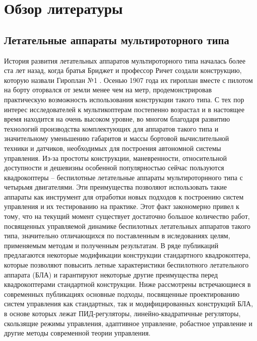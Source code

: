 

\chapter{Обзор литературы} \label{review}
\section{Летательные аппараты мультироторного типа} \label{review_s1}

История развития летательных аппаратов мультироторного типа началась более ста лет назад, когда братья Бриджет и профессор Ричет создали конструкцию, которую назвали Гироплан №1 \cite{Leishman02, Leishman01}. Осенью 1907 года их гироплан вместе с пилотом на борту оторвался от земли менее чем на метр, продемонстрировав практическую возможность использования конструкции такого типа. С тех пор интерес исследователей к мультикоптерам постепенно возрастал и в настоящее время находится на очень высоком уровне, во многом благодаря развитию технологий производства комплектующих для аппаратов такого типа и значительному уменьшению габаритов и массы бортовой вычислительной техники и датчиков, необходимых для построения автономной системы управления. Из-за простоты конструкции, маневренности, относительной доступности и дешевизны особенной популярностью сейчас пользуются квадрокоптеры -- беспилотные летательные аппараты мультироторнного типа с четырьмя двигателями. Эти преимущества позволяют использовать такие аппараты как инструмент для отработки новых подходов к построению систем управления и их тестированию на практике. Этот факт закономерно привел к тому, что на текущий момент существует достаточно большое количество работ, посвященных управляемой динамике беспилотных летательных аппаратов такого типа, значительно отличающихся по поставленным в иследованиях целям, применяемым методам и полученным результатам. В ряде публикаций предлагаются некоторые модификации конструкции стандартного квадрокоптера, которые позволяют повысить летные характеристики беспилотного летательного аппарата (БЛА) и гарантируют некоторые другие преимущества перед квадрокоптерами стандартной конструкции. Ниже рассмотрены встречающиеся в современных публикациях основные подходы, посвященные проектированию систем управления как стандартных, так и модифицированных конструкций БЛА, в основе которых лежат ПИД-регуляторы, линейно-квадратичные регуляторы, скользящие режимы управления, адаптивное управление, робастное управление и другие методы современной теории управления.

